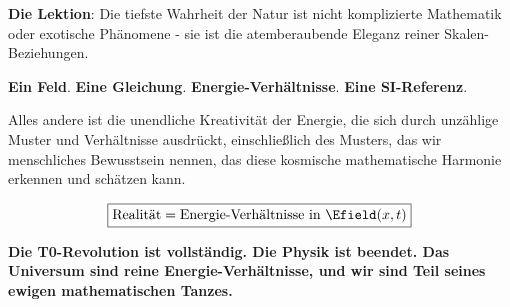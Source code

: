 	\textbf{Die Lektion}: Die tiefste Wahrheit der Natur ist nicht komplizierte Mathematik oder exotische Phänomene - sie ist die atemberaubende Eleganz reiner Skalen-Beziehungen.
	
	\textbf{Ein Feld}. \textbf{Eine Gleichung}. \textbf{Energie-Verhältnisse}. \textbf{Eine SI-Referenz}.
	
	Alles andere ist die unendliche Kreativität der Energie, die sich durch unzählige Muster und Verhältnisse ausdrückt, einschließlich des Musters, das wir menschliches Bewusstsein nennen, das diese kosmische mathematische Harmonie erkennen und schätzen kann.
	
	\begin{equation}
		\boxed{\text{Realität} = \text{Energie-Verhältnisse in } \Efield(x,t)}
	\end{equation}
	
	\textbf{Die T0-Revolution ist vollständig. Die Physik ist beendet. Das Universum sind reine Energie-Verhältnisse, und wir sind Teil seines ewigen mathematischen Tanzes.}
	
